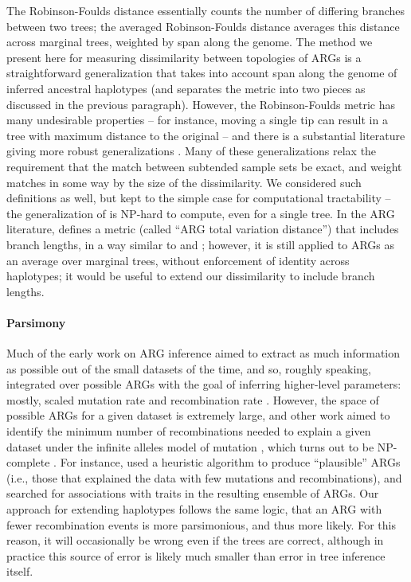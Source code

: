 \documentclass[10pt,twoside,lineno]{gsajnl}
\begin{document}
The Robinson-Foulds distance \citep{robinson1981comparison}
essentially counts the number of differing branches between two trees;
the averaged Robinson-Foulds distance \citep{kelleher2019inferring}
averages this distance across marginal trees, weighted by span along the genome.
The method we present here for measuring dissimilarity between topologies of ARGs
is a straightforward generalization
that takes into account span along the genome of inferred ancestral haplotypes
(and separates the metric into two pieces as discussed in the previous paragraph).
However, the Robinson-Foulds metric has many undesirable properties --
for instance, moving a single tip can result in a tree with maximum distance to the original --
and there is a substantial literature giving more robust generalizations
\citep[reviewed by][]{llabres2021generalized}.
Many of these generalizations \citep[e.g.,][]{bocker2013generalized}
relax the requirement that the match between subtended sample sets be exact,
and weight matches in some way by the size of the dissimilarity.
We considered such definitions as well, but kept to the simple case
for computational tractability --
the generalization of \citet{bocker2013generalized} is NP-hard to compute, even for a single tree.
In the ARG literature, \citet{zhang2023biobankscale}
defines a metric (called ``ARG total variation distance'') that includes branch lengths,
in a way similar to \citet{robinson1979comparison} and \citet{kuhner1994simulation};
however, it is still applied to ARGs as an average over marginal trees,
without enforcement of identity across haplotypes;
it would be useful to extend our dissimilarity to include branch lengths.

\paragraph{Parsimony}
Much of the early work on ARG inference aimed to extract as much information as possible
out of the small datasets of the time,
and so, roughly speaking, integrated over possible ARGs
with the goal of inferring higher-level parameters:
mostly, scaled mutation rate and recombination rate
\citep[e.g.,][]{hudson1985statistical,griffiths1996ancestral,kuhner2000maximum,stephens2000inference,fearnhead2001estimating}.
However, the space of possible ARGs for a given dataset is extremely large,
and other work aimed to identify the minimum number of recombinations
needed to explain a given dataset under the infinite alleles model of mutation
\citep[e.g.,][]{hein1990reconstructing,myers2003bounds,song2005constructing},
which turns out to be NP-complete \citep{wang2001perfect}.
For instance, \citet{minichiello2006mapping}
used a heuristic algorithm to produce ``plausible'' ARGs
(i.e., those that explained the data with few mutations and recombinations),
and searched for associations with traits in the resulting ensemble of ARGs.
Our approach for extending haplotypes follows the same logic,
that an ARG with fewer recombination events is more parsimonious,
and thus more likely.
For this reason, it will occasionally be wrong even if the trees are correct,
although in practice this source of error is likely much smaller than error in tree inference itself.
\end{document}
